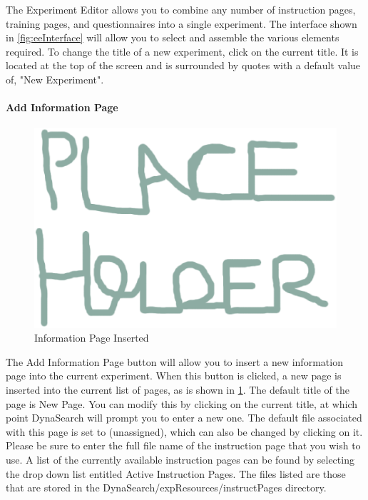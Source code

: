 \documentclass[article]{ij4uq}              %
\begin{document}
The Experiment Editor allows you to combine any number of instruction pages, training pages, and questionnaires into a single experiment. The interface shown in \ref{fig:eeInterface} will allow you to select and assemble the various elements required. To change the title of a new experiment, click on the current title. It is located at the top of the screen and is surrounded by quotes with a default value of, "New Experiment".

\paragraph{Add Information Page}

\begin{figure}[h!]
 \centering
 \includegraphics[width=5.0in]{figures/place.eps}
 \caption{Information Page Inserted}
 \label{fig:infoInsert}
\end{figure}
\FloatBarrier

The Add Information Page button will allow you to insert a new information page into the current experiment. When this button is clicked, a new page is inserted into the current list of pages, as is shown in \ref{fig:infoInsert}. The default title of the page is New Page. You can modify this by clicking on the current title, at which point DynaSearch will prompt you to enter a new one. The default file associated with this page is set to (unassigned), which can also be changed by clicking on it. Please be sure to enter the full file name of the instruction page that you wish to use. A list of the currently available instruction pages can be found by selecting the drop down list entitled Active Instruction Pages. The files listed are those that are stored in the DynaSearch/expResources/instructPages directory.
\end{document}
